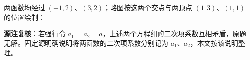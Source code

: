 \begin{answer}

两函数均经过 $(-1,2)$、$(3,2)$；略图按这两个交点与两顶点 $(1,3)$、$(1,1)$ 的位置绘制：
\nopagebreak[4]
\begin{center}\end{center}
\nopagebreak[4]
\begin{gktip}
\textbf{源注复核}：若强行令 $a_1=a_2=a$，上述两个方程组的二次项系数互相矛盾，原题无解。固定源明确说明将两函数的二次项系数分别记为 $a_1\text{、}a_2$，本文按该说明整理。
\end{gktip}




\end{answer}
